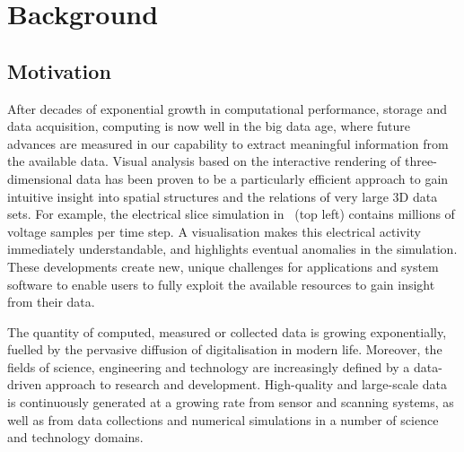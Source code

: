
\chapter{Background}

\section{Motivation}

After decades of exponential growth in computational performance, storage and
data acquisition, computing is now well in the big data age, where future
advances are measured in our capability to extract meaningful information from
the available data. Visual analysis based on the interactive rendering of
three-dimensional data has been proven to be a particularly efficient approach
to gain intuitive insight into spatial structures and the relations of very
large 3D data sets. For example, the electrical slice simulation in
~(top left) contains millions of voltage samples per time step.
A visualisation makes this electrical activity immediately understandable, and
highlights eventual anomalies in the simulation. These developments create new,
unique challenges for applications and system software to enable users to fully
exploit the available resources to gain insight from their data.

The quantity of computed, measured or collected data is growing exponentially,
fuelled by the pervasive diffusion of digitalisation in modern life. Moreover,
the fields of science, engineering and technology are increasingly defined by a
data-driven approach to research and development. High-quality and
large-scale data is continuously generated at a growing rate from sensor and
scanning systems, as well as from data collections and numerical simulations in
a number of science and technology domains.


